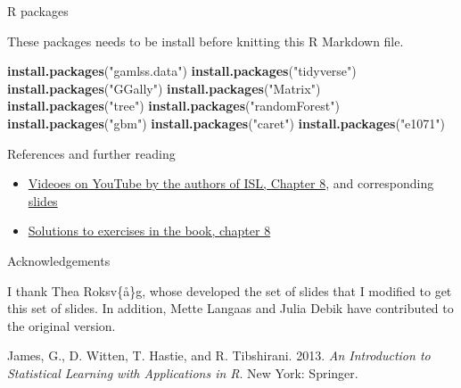 \documentclass[10pt,ignorenonframetext,]{beamer}
\newenvironment{Shaded}{\begin{snugshade}}{\end{snugshade}}
\newcommand{\KeywordTok}[1]{\textcolor[rgb]{0.13,0.29,0.53}{\textbf{#1}}}
\newcommand{\StringTok}[1]{\textcolor[rgb]{0.31,0.60,0.02}{#1}}
\newcommand{\NormalTok}[1]{#1}
\providecommand{\tightlist}{%
  \setlength{\itemsep}{0pt}\setlength{\parskip}{0pt}}
\begin{document}
\begin{frame}[fragile]{R packages}

These packages needs to be install before knitting this R Markdown file.

\begin{Shaded}
\begin{Highlighting}[]
\KeywordTok{install.packages}\NormalTok{(}\StringTok{"gamlss.data"}\NormalTok{)}
\KeywordTok{install.packages}\NormalTok{(}\StringTok{"tidyverse"}\NormalTok{)}
\KeywordTok{install.packages}\NormalTok{(}\StringTok{"GGally"}\NormalTok{)}
\KeywordTok{install.packages}\NormalTok{(}\StringTok{"Matrix"}\NormalTok{)}
\KeywordTok{install.packages}\NormalTok{(}\StringTok{"tree"}\NormalTok{)}
\KeywordTok{install.packages}\NormalTok{(}\StringTok{"randomForest"}\NormalTok{)}
\KeywordTok{install.packages}\NormalTok{(}\StringTok{"gbm"}\NormalTok{)}
\KeywordTok{install.packages}\NormalTok{(}\StringTok{"caret"}\NormalTok{)}
\KeywordTok{install.packages}\NormalTok{(}\StringTok{"e1071"}\NormalTok{)}
\end{Highlighting}
\end{Shaded}

\end{frame}

\begin{frame}{References and further reading}

\begin{itemize}
\tightlist
\item
  \href{https://www.youtube.com/playlist?list=PL5-da3qGB5IB23TLuA8ZgVGC8hV8ZAdGh}{Videoes
  on YouTube by the authors of ISL, Chapter 8}, and corresponding
  \href{https://lagunita.stanford.edu/c4x/HumanitiesScience/StatLearning/asset/trees.pdf}{slides}
\item
  \href{https://rstudio-pubs-static.s3.amazonaws.com/65564_925dfde884e14ef9b5735eddd16c263e.html}{Solutions
  to exercises in the book, chapter 8}
\end{itemize}

\end{frame}

\begin{frame}{Acknowledgements}

I thank Thea Roksv\{\aa\}g, whose developed the set of slides that I
modified to get this set of slides. In addition, Mette Langaas and Julia
Debik have contributed to the original version.

\hypertarget{refs}{}
\hypertarget{ref-james.etal}{}
James, G., D. Witten, T. Hastie, and R. Tibshirani. 2013. \emph{An
Introduction to Statistical Learning with Applications in R}. New York:
Springer.

\end{frame}
\end{document}
